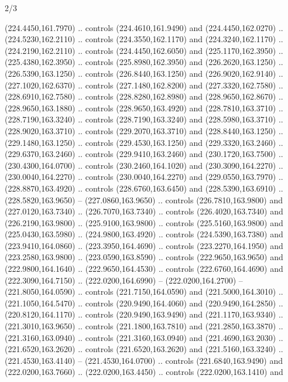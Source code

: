 \begin{flagdescription}{2/3}
\begin{scope}[xshift=0.5\flaglength,yshift=0.5\flagwidth,scale=\flagwidth/259.2]
\begin{scope}[y=0.8pt, x=0.8pt, yscale=-1,shift={(-243,-162)}]
      (224.4450,161.7970) .. controls (224.4610,161.9490) and (224.4450,162.0270) ..
      (224.5230,162.2110) .. controls (224.3550,162.1170) and (224.3240,162.1170) ..
      (224.2190,162.2110) .. controls (224.4450,162.6050) and (225.1170,162.3950) ..
      (225.4380,162.3950) .. controls (225.8980,162.3950) and (226.2620,163.1250) ..
      (226.5390,163.1250) .. controls (226.8440,163.1250) and (226.9020,162.9140) ..
      (227.1020,162.6370) .. controls (227.1480,162.8200) and (227.3320,162.7580) ..
      (228.6910,162.7580) .. controls (228.8280,162.8980) and (228.9650,162.8670) ..
      (228.9650,163.1880) .. controls (228.9650,163.4920) and (228.7810,163.3710) ..
      (228.7190,163.3240) .. controls (228.7190,163.3240) and (228.5980,163.3710) ..
      (228.9020,163.3710) .. controls (229.2070,163.3710) and (228.8440,163.1250) ..
      (229.1480,163.1250) .. controls (229.4530,163.1250) and (229.3320,163.2460) ..
      (229.6370,163.2460) .. controls (229.9410,163.2460) and (230.1720,163.7500) ..
      (230.4300,164.0700) .. controls (230.2460,164.1020) and (230.3090,164.2270) ..
      (230.0040,164.2270) .. controls (230.0040,164.2270) and (229.0550,163.7970) ..
      (228.8870,163.4920) .. controls (228.6760,163.6450) and (228.5390,163.6910) ..
      (228.5820,163.9650) -- (227.0860,163.9650) .. controls (226.7810,163.9800) and
      (227.0120,163.7340) .. (226.7070,163.7340) .. controls (226.4020,163.7340) and
      (226.2190,163.9800) .. (225.9100,163.9800) .. controls (225.5160,163.9800) and
      (225.0430,163.5980) .. (224.9800,163.4920) .. controls (224.5390,163.7380) and
      (223.9410,164.0860) .. (223.3950,164.4690) .. controls (223.2270,164.1950) and
      (223.2580,163.9800) .. (223.0590,163.8590) .. controls (222.9650,163.9650) and
      (222.9800,164.1640) .. (222.9650,164.4530) .. controls (222.6760,164.4690) and
      (222.3090,164.7150) .. (222.0200,164.6990) -- (222.0200,164.2700) --
      (221.8050,164.0590) .. controls (221.7150,164.0590) and (221.5000,164.3010) ..
      (221.1050,164.5470) .. controls (220.9490,164.4060) and (220.9490,164.2850) ..
      (220.8120,164.1170) .. controls (220.9490,163.9490) and (221.1170,163.9340) ..
      (221.3010,163.9650) .. controls (221.1800,163.7810) and (221.2850,163.3870) ..
      (221.3160,163.0940) .. controls (221.3160,163.0940) and (221.4690,163.2030) ..
      (221.6520,163.2620) .. controls (221.6520,163.2620) and (221.5160,163.3240) ..
      (221.4530,163.4140) -- (221.4530,164.0700) .. controls (221.6840,163.9490) and
      (222.0200,163.7660) .. (222.0200,163.4450) .. controls (222.0200,163.1410) and

\end{scope}
\end{scope}
\end{flagdescription}
